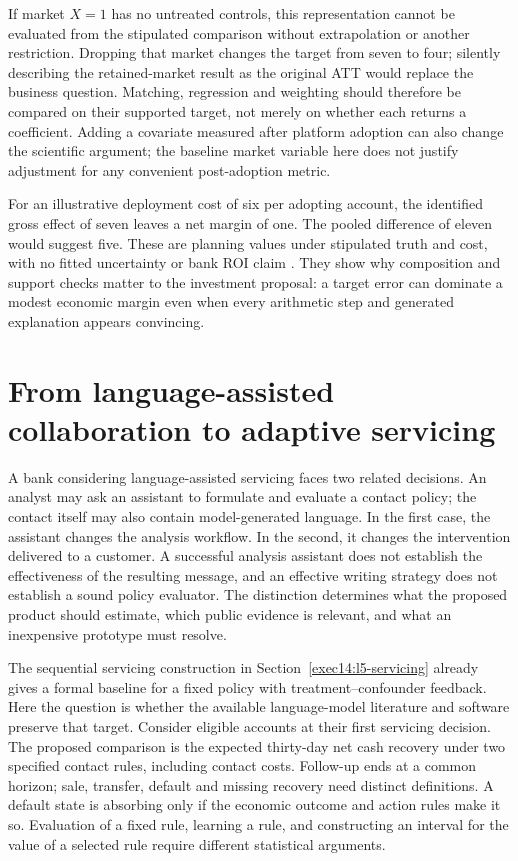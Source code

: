 If market $X=1$ has no untreated controls, this representation cannot be
evaluated from the stipulated comparison without extrapolation or another
restriction. Dropping that market changes the target from seven to four;
silently describing the retained-market result as the original ATT would
replace the business question. Matching, regression and weighting should
therefore be compared on their supported target, not merely on whether each
returns a coefficient. Adding a covariate measured after platform adoption
can also change the scientific argument; the baseline market variable here
does not justify adjustment for any convenient post-adoption metric.

For an illustrative deployment cost of six per adopting account, the
identified gross effect of seven leaves a net margin of one. The pooled
difference of eleven would suggest five. These are planning values under
stipulated truth and cost, with no fitted uncertainty or bank ROI claim
\citep{exec14_workflow_remainder}. They show why composition and support checks
matter to the investment proposal: a target error can dominate a modest
economic margin even when every arithmetic step and generated explanation
appears convincing.
\label{exec14:l5-depth-end}


\section{From language-assisted collaboration to adaptive servicing}
\label{exec16:longitudinal-policy}

A bank considering language-assisted servicing faces two related decisions.
An analyst may ask an assistant to formulate and evaluate a contact policy;
the contact itself may also contain model-generated language. In the first
case, the assistant changes the analysis workflow. In the second, it changes
the intervention delivered to a customer. A successful analysis assistant
does not establish the effectiveness of the resulting message, and an
effective writing strategy does not establish a sound policy evaluator.
The distinction determines what the proposed product should estimate, which
public evidence is relevant, and what an inexpensive prototype must resolve.

The sequential servicing construction in
Section~\ref{exec14:l5-servicing} already gives a formal baseline for a
fixed policy with treatment--confounder feedback.
Here the question is whether the available language-model literature and
software preserve that target. Consider eligible accounts at their first
servicing decision. The proposed comparison is the expected thirty-day net
cash recovery under two specified contact rules, including contact costs.
Follow-up ends at a common horizon; sale, transfer, default and missing
recovery need distinct definitions. A default state is absorbing only if
the economic outcome and action rules make it so. Evaluation of a fixed
rule, learning a rule, and constructing an interval for the value of a
selected rule require different statistical arguments.

